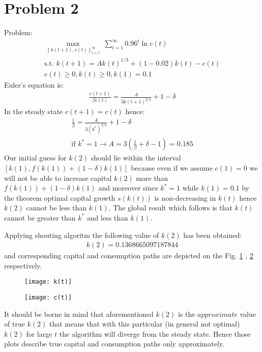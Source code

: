 \documentclass[a4paper]{article}
\begin{document}
\section*{Problem 2}
Problem:
\begin{align*}
\underset{\left\{k(t+1), c(t)\right\}_{t=1}^{\infty}}{\max}\ \sum_{t=1}^{\infty} 0.96^t \ln c(t)\\
\text{s.t.\ } k(t+1) = Ak(t)^{1/3} + (1-0.02)k(t) - c(t)\\
c(t) \ge 0, k(t) \ge 0, k(1) = 0.1
\end{align*}
Euler's equation is:
\begin{align*}
\frac{c(t+1)}{\beta c(t)} = \frac{A}{3k(t+1)^{2/3}} + 1 - \delta
\end{align*}
In the steady state $c(t+1) = c(t)$ hence:
\begin{align*}
\frac{1}{\beta} = \frac{A}{3(k^*)^{2/3}} + 1 - \delta\\
\text{if } k^* = 1 \to A = 3(\frac{1}{\beta} + \delta - 1) = 0.185
\end{align*}
Our initial guess for $k(2)$ should lie within the interval $ [k(1), f(k(1)) + (1 - \delta)k(1)]$ because even if we assume $c(1) = 0$ we will not be able to increase capital $k(2)$ more than $f(k(1)) + (1 - \delta)k(1)$ and moreover since $k^* = 1$ while $k(1) = 0.1$ by the theorem optimal capital growth $s(k(t))$ is non-decreasing in $k(t)$ hence $k(2)$ cannot be less than $k(1)$. The global result which follows is that $k(t)$ cannot be greater than $k^*$ and less than $k(1)$.



Applying shouting algoritm the following value of $k(2)$ has been obtained:
\begin{align*}
k(2) = 0.1368665097187844
\end{align*}
and corresponding capital and consumption paths are depicted on the Fig. \ref{fig1} , \ref{fig2} respectively.
\begin{figure}[h]
	\centering
	\texttt{[image: k(t)]}
	\caption{}\label{fig1}
\end{figure}
\begin{figure}[h]
	\centering
	\texttt{[image: c(t)]}
	\caption{}\label{fig2}
\end{figure}




It should be borne in mind that aforementioned $k(2)$ is the $\textit{approximate}$ value of true $k(2)$ that means that with this particular (in general not optimal) $k(2)$ for large $t$ the algorithm will diverge from the steady state. Hence those plots describe true capital and consumption paths only approximately. 
\end{document}

